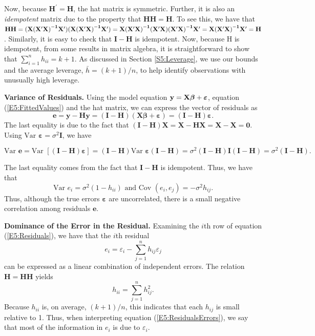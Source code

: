 Now, because $\mathbf{H}^{\prime}=\mathbf{H}$, the hat matrix is
symmetric. Further, it is also an \textit{idempotent} matrix due to the property that $%
\mathbf{HH}=\mathbf{H}$. To see this, we have that $\mathbf{HH}=\mathbf{(X(%
\mathbf{X}^{\prime}X)}^{\mathbf{-1}}\mathbf{X}^{\prime}\mathbf{)(X(\mathbf{%
X}^{\prime}X)}^{\mathbf{-1}}\mathbf{X}^{\prime}\mathbf{)}=\mathbf{X(%
\mathbf{X}^{\prime}X)}^{\mathbf{-1}}\mathbf{(\mathbf{X}^{\prime}X)(\mathbf{%
X}^{\prime}X)}^{\mathbf{-1}}\mathbf{X}^{\prime}=\mathbf{X(\mathbf{X}%
^{\prime}X)}^{\mathbf{-1}}\mathbf{X}^{\prime}=\mathbf{H}$.
Similarly, it is easy to check that $\mathbf{I-H}$ is idempotent.
Now, because H is idempotent, from some results in matrix algebra,
it is straightforward to show that $\sum_{i=1}^{n}h_{ii}=k+1$. As
discussed in Section \ref{S5:Leverage}, we use our bounds and the
average leverage, $\bar{h}=(k+1)/n$, to help identify observations
with unusually high leverage.

\textbf{Variance of Residuals.} Using the model equation $\mathbf{y}=\mathbf{%
X \boldsymbol \beta + \boldsymbol \varepsilon}$, equation
(\ref{E5:FittedValues}) and the hat matrix, we can express the
vector of residuals as
\begin{equation}\label{E5:Residuals}
\mathbf{e}=\mathbf{y-Hy}=\mathbf{(I-H)(X \boldsymbol \beta
+\boldsymbol \varepsilon)}=\mathbf{(I-H) \boldsymbol \varepsilon}.
\end{equation}
The last equality is due to the fact that $\mathbf{(I-H)X}=\mathbf{X-HX}=%
\mathbf{X-X}=\mathbf{0}$. Using $\text{Var } \boldsymbol \varepsilon
= \sigma ^2 \mathbf{I}$, we have
\begin{center}
\[
\text{Var }\mathbf{e}=\text{Var }\left[ \mathbf{(I-H)\boldsymbol \varepsilon}\right] =%
\mathbf{(I-H)}\text{Var }\boldsymbol \varepsilon \mathbf{(I-H)}=\sigma ^2\mathbf{(I-H)I(I-H)}%
=\sigma ^2\mathbf{(I-H)}.
\]
\end{center}
The last equality comes from the fact that $\mathbf{I-H}$ is
idempotent. Thus, we have that
\begin{equation}\label{E5:VarResiduals}
\text{Var }e_i=\sigma ^2(1-h_{ii})\text{ \ and \ Cov }%
(e_i,e_j)=-\sigma ^2h_{ij}.
\end{equation}
Thus, although the true errors $\boldsymbol \varepsilon$ are
uncorrelated, there is a small negative correlation among residuals
$\mathbf e$.

\textbf{Dominance of the Error in the Residual.} Examining the $i$th
row of equation (\ref{E5:Residuals}), we have that the $i$th
residual
\begin{equation}\label{E5:ResidualsErrors}
e_i=\varepsilon_i - \sum_{j=1}^{n} h_{ij} \varepsilon_j
\end{equation}
can be expressed as a linear combination of independent errors. The
relation $ \mathbf{H}=\mathbf{HH}$ yields
\begin{equation}\label{E5:Leverages}
h_{ii}=\sum_{j=1}^{n} h_{ij}^2.
\end{equation}
Because $h_{ii}$ is, on average, $(k+1)/n$, this indicates that each
$h_{ij}$ is small relative to 1. Thus, when interpreting equation
(\ref{E5:ResidualsErrors}), we say that most of the information in
$e_i$ is due to $\varepsilon_i$.

